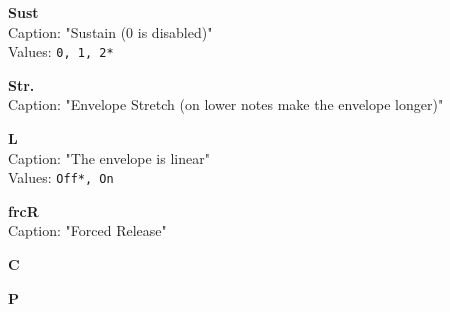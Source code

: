 \documentclass[
 11pt,
 twoside,
 a4paper,
 headinclude,
 footinclude,
 final                                 %
]{article}
\begin{document}
\begin{enumber}
\begin{enumber}
\begin{enumber}
\begin{enumber}
\begin{enumber}
\begin{enumber}
\begin{enumber}
                        \item \textbf{Sust} \\
                           Caption: "Sustain (0 is disabled)" \\
                           Values: \texttt{0, 1, 2*}
                        \item \textbf{Str.} \\
                           Caption: "Envelope Stretch (on lower notes make the
                              envelope longer)"
                        \item \textbf{L} \\
                           Caption: "The envelope is linear" \\
                           Values: \texttt{Off*, On}
                        \item \textbf{frcR} \\
                           Caption: "Forced Release"
                     \end{enumber}
                     \item \textbf{C}
                     \item \textbf{P}
                  \end{enumber}
            \end{enumber}



\end{enumber}
\end{enumber}
\end{enumber}
\end{enumber}
\end{document}
